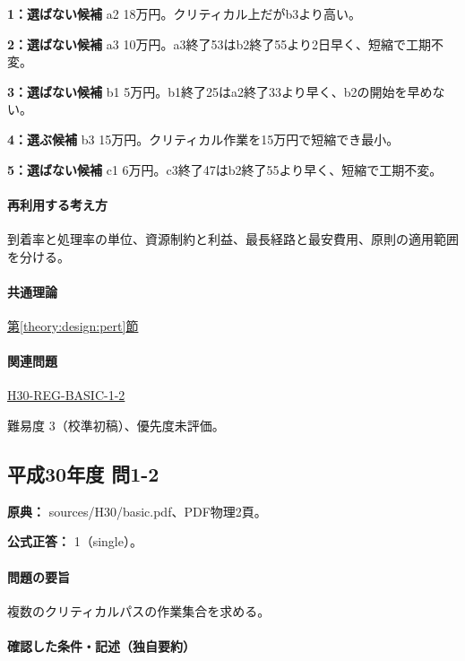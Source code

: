\noindent\textbf{1：選ばない候補} a2 18万円。クリティカル上だがb3より高い。\par

\noindent\textbf{2：選ばない候補} a3 10万円。a3終了53はb2終了55より2日早く、短縮で工期不変。\par

\noindent\textbf{3：選ばない候補} b1 5万円。b1終了25はa2終了33より早く、b2の開始を早めない。\par

\noindent\textbf{4：選ぶ候補} b3 15万円。クリティカル作業を15万円で短縮でき最小。\par

\noindent\textbf{5：選ばない候補} c1 6万円。c3終了47はb2終了55より早く、短縮で工期不変。\par

\paragraph{再利用する考え方} 到着率と処理率の単位、資源制約と利益、最長経路と最安費用、原則の適用範囲を分ける。

\paragraph{共通理論} \hyperref[theory:design:pert]{第\ref*{theory:design:pert}節}

\paragraph{関連問題} \hyperref[q:h30-reg-basic-1-2]{H30-REG-BASIC-1-2}

\par 難易度 3（校準初稿）、優先度未評価。

\subsection{平成30年度 問1-2}
\label{q:h30-reg-basic-1-2}

\noindent\textbf{原典：} sources/H30/basic.pdf、PDF物理2頁。

\textbf{公式正答：} 1（single）。

\paragraph{問題の要旨} 複数のクリティカルパスの作業集合を求める。

\paragraph{確認した条件・記述（独自要約）}\mbox{}\par

